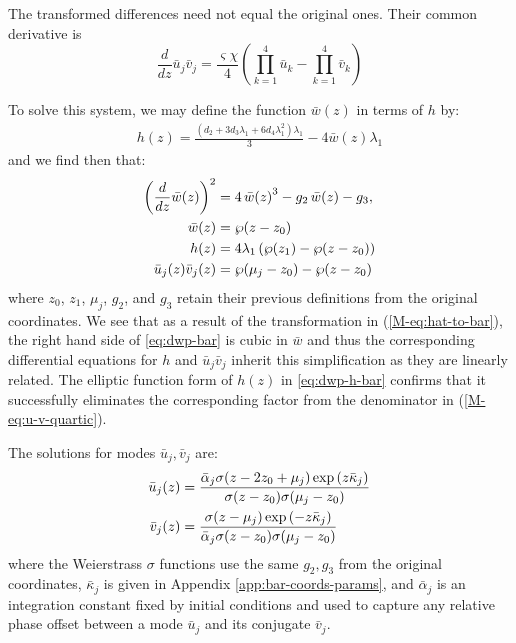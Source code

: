 \documentclass[11pt,a4paper]{article}
\newcommand{\externaleqref}[1]{\textup{(\ref*{#1})}}
\begin{document}
The transformed differences need not equal the original ones. Their common derivative is
\begin{equation}
\label{eq:duv_bar_j}
\frac{d}{d z} \bar{u}_j \bar{v}_j = \frac{\varsigma \chi}{4}\left(\prod\limits_{k=1}^{4} \bar{u}_k - \prod\limits_{k=1}^{4} \bar{v}_k\right)
\end{equation}

To solve this system, we may define the function $\bar{w}(z)$ in terms of $h$ by:
\begin{align}
h{\left(z \right)} = \frac{\left({d}_{2} + 3 {d}_{3} {\lambda}_{1} + 6 {d}_{4} {\lambda}_{1}^{2}\right) {\lambda}_{1}}{3} - 4 \bar{w}{\left(z \right)} {\lambda}_{1}
\end{align}
and we find then that:
\begin{align}
\left(\frac{d}{d z} \bar{w}{\left(z \right)}\right)^{2} &= 4\,\bar{w}{\left(z \right)}^3 - g_2\,\bar{w}{\left(z \right)} - g_3, \notag \\
\bar{w}(z) &= \wp (z - z_0) \label{eq:dwp-bar} \\
h(z) &= 4\lambda_1\left(\wp (z_1) - \wp (z - z_0)\right) \label{eq:dwp-h-bar} \\
\bar{u}_j(z)\bar{v}_j(z) &= \wp(\mu_j - z_0) - \wp(z - z_0)
\end{align}
where $z_0$, $z_1$, $\mu_j$, $g_2$, and $g_3$ retain their previous definitions from the original coordinates.
We see that as a result of the transformation in \externaleqref{M-eq:hat-to-bar}, the right hand side of \eqref{eq:dwp-bar} is cubic in $\bar{w}$ and thus the corresponding differential equations for $h$ and $\bar{u}_j\bar{v}_j$ inherit this simplification as they are linearly related.
The elliptic function form of $h(z)$ in \eqref{eq:dwp-h-bar} confirms that it successfully eliminates the corresponding factor from the denominator in \externaleqref{M-eq:u-v-quartic}.

The solutions for modes $\bar{u}_j, \bar{v}_j$ are:
\begin{align}
\bar{u}_j(z) &= \frac{\bar{\alpha}_{j} \sigma{\left(z - 2 z_{0} + {\mu}_{j}\right)} \exp{\left( z \bar{\kappa}_j\right)} }{\sigma{\left(z - z_{0}\right)} \sigma{\left({\mu}_{j} - z_{0}\right)}} \notag \\
\bar{v}_j(z) &= \frac{\sigma{\left(z - {\mu}_{j}\right)} \exp{\left(- z \bar{\kappa}_j\right)}}{\bar{\alpha}_{j} \sigma{\left(z - z_{0}\right)} \sigma{\left({\mu}_{j} - z_{0}\right)} } \label{eq:u-v-bar}
\end{align}
where the Weierstrass $\sigma$ functions use the same $g_2,g_3$ from the original coordinates,
$\bar{\kappa}_j$ is given in Appendix \ref{app:bar-coords-params}, and $\bar{\alpha}_j$ is an integration constant fixed by initial conditions and used to capture any relative phase offset between a mode $\bar{u}_j$ and its conjugate $\bar{v}_j$.
\end{document}
